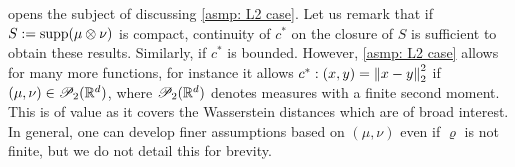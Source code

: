 \begin{remark}\label{remark: assumption L2 case}
     opens the subject of discussing \cref{asmp: L2 case}. Let us remark that if $S:=\text{supp}(\mu\otimes\nu)$ is compact, continuity of $c^*$ on the closure of $S$ is sufficient to obtain these results. Similarly, if $c^*$ is bounded. However, \cref{asmp: L2 case} allows for many more functions, for instance it allows $c^*:(x,y)=\left\lVert x-y\right\rVert^2_2$ if $(\mu,\nu)\in\mathscr{P}_2(\mathbb{R}^d)$, where $\mathscr{P}_2(\mathbb{R}^d)$ denotes measures with a finite second moment. This is of value as it covers the Wasserstein distances which are of broad interest. In general, one can develop finer assumptions based on $(\mu,\nu)$ even if $\varrho$ is not finite, but we do not detail this for brevity.
\end{remark}


